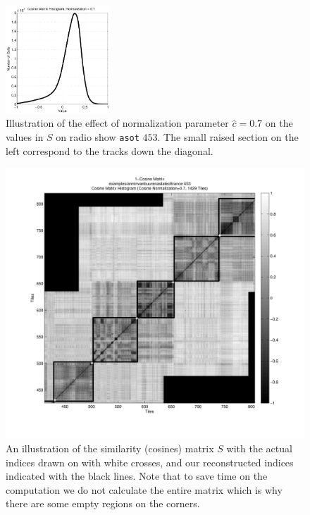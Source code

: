 \documentclass[twocolumn]{article}
\begin{document}
		\begin{figure}
			\centering
			\includegraphics[width=0.35\textwidth]{images/cosine_histogram}
			
			\caption{Illustration of the effect of normalization parameter $\hat c=0.7$ on the values in $S$ on radio show \texttt{asot} $453$. The small raised section on the left correspond to the tracks down the diagonal.}
			\label{fig:cosine_norm}
		\end{figure} 
	
	\begin{figure}[t]
		\centering
		\includegraphics[width=1.08\textwidth]{images/cosines}
		\caption{An illustration of the similarity (cosines) matrix $S$ with the actual indices drawn on with white crosses, and our reconstructed indices indicated with the black lines. Note that to save time on the computation we do not calculate the entire matrix which is why there are some empty regions on the corners.}
		\label{fig:simmatrix}
	\end{figure} 
	
\end{document}
